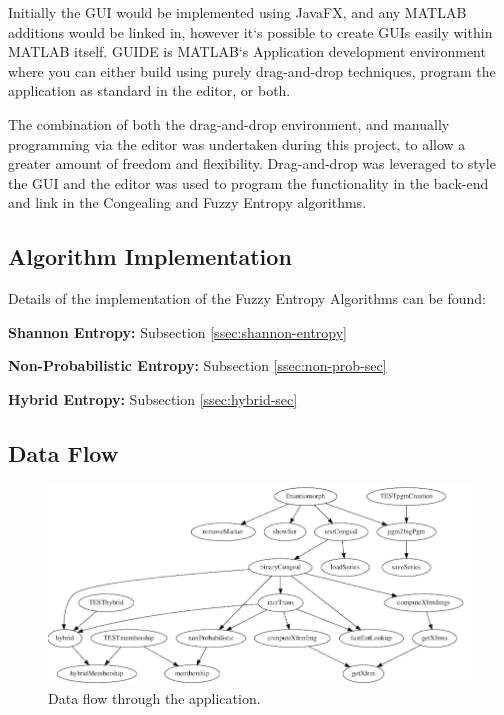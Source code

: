 Initially the \acrfull{GUI} would be implemented using JavaFX, and any MATLAB additions would be linked in, however it`s possible to create \acrshort{GUI}s easily within MATLAB itself. GUIDE \cite{guide} is MATLAB`s Application development environment where you can either build using purely drag-and-drop techniques, program the application as standard in the editor, or both.

The combination of both the drag-and-drop environment, and manually programming via the editor was undertaken during this project, to allow a greater amount of freedom and flexibility. Drag-and-drop was leveraged to style the \acrshort{GUI} and the editor was used to program the functionality in the back-end and link in the \Gls{Congealing} and Fuzzy Entropy algorithms.

\vspace{1cm}
\subsection{Algorithm Implementation}

Details of the implementation of the Fuzzy Entropy Algorithms can be found:

\textbf{Shannon Entropy: } Subsection \ref{ssec:shannon-entropy}

\textbf{Non-Probabilistic Entropy: } Subsection \ref{ssec:non-prob-sec}

\textbf{Hybrid Entropy: } Subsection \ref{ssec:hybrid-sec}

\subsection{Data Flow}

\begin{figure}[H]
  \centering
  \includegraphics[width=\textwidth]{Chapter2/software-img/data_flow_2.png}
  \caption{Data flow through the application.}
  \label{fig:data-flow}
\end{figure}

